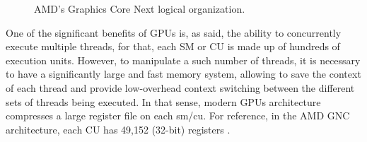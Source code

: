 \begin{figure}[htb]
  \begin{subfigmatrix}{2}
  \end{subfigmatrix}
  \caption{AMD's Graphics Core Next logical organization.}
  \label{fig:Vega10arch}
\end{figure}


One of the significant benefits of GPUs is, as said, the ability to concurrently execute multiple threads, for that, each SM or CU is made up of hundreds of execution units. However, to manipulate a such number of threads, it is necessary to have a significantly large and fast memory system, allowing to save the context of each thread and provide low-overhead context switching between the different sets of threads being executed. In that sense, modern GPUs architecture compresses a large register file on each \acrshort{sm}/\acrshort{cu}. For reference, in the AMD GNC architecture, each CU has 49,152 (32-bit) registers \cite{jing_energy-efficient_2013}.

